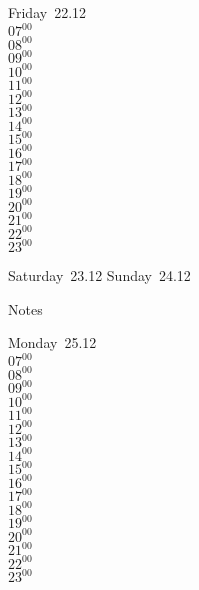 \documentclass[11pt, a4paper]{book}\usepackage[]{graphicx}\usepackage[]{color}
\begin{document}
\begin{weekdaybox}
  Friday~22.12\\
  { 
  \vfill
  $07^{00}$\\
$08^{00}$\\
$09^{00}$\\
$10^{00}$\\
$11^{00}$\\
$12^{00}$\\
$13^{00}$\\
$14^{00}$\\
$15^{00}$\\
$16^{00}$\\
$17^{00}$\\
$18^{00}$\\
$19^{00}$\\
$20^{00}$\\
$21^{00}$\\
$22^{00}$\\
$23^{00}$\\
  }
\end{weekdaybox}
\begin{weekendbox}
  Saturday~23.12
  \tcblower
  Sunday~24.12
\end{weekendbox} %
\begin{notebox}
  Notes
\end{notebox}
\clearpage
\begin{headerbox}
\end{headerbox}
\begin{weekdaybox}
  Monday~25.12\\
  { 
  \vfill
  $07^{00}$\\
$08^{00}$\\
$09^{00}$\\
$10^{00}$\\
$11^{00}$\\
$12^{00}$\\
$13^{00}$\\
$14^{00}$\\
$15^{00}$\\
$16^{00}$\\
$17^{00}$\\
$18^{00}$\\
$19^{00}$\\
$20^{00}$\\
$21^{00}$\\
$22^{00}$\\
$23^{00}$\\
  }
\end{weekdaybox}
\end{document}
